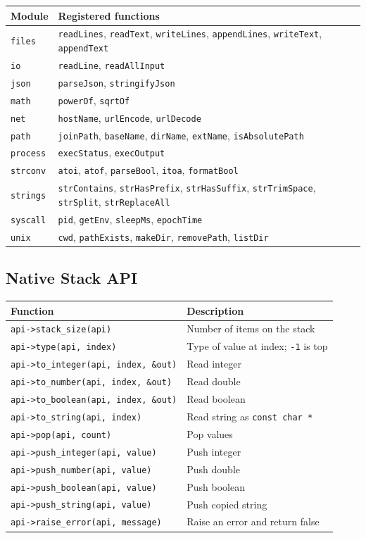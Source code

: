 \documentclass[11pt,a4paper]{article}
\newcommand{\code}[1]{\texttt{#1}}
\begin{document}
\begin{longtable}{ll}
\toprule
Module & Registered functions \\
\midrule
\code{files} & \code{readLines}, \code{readText}, \code{writeLines}, \code{appendLines}, \code{writeText}, \code{appendText} \\
\code{io} & \code{readLine}, \code{readAllInput} \\
\code{json} & \code{parseJson}, \code{stringifyJson} \\
\code{math} & \code{powerOf}, \code{sqrtOf} \\
\code{net} & \code{hostName}, \code{urlEncode}, \code{urlDecode} \\
\code{path} & \code{joinPath}, \code{baseName}, \code{dirName}, \code{extName}, \code{isAbsolutePath} \\
\code{process} & \code{execStatus}, \code{execOutput} \\
\code{strconv} & \code{atoi}, \code{atof}, \code{parseBool}, \code{itoa}, \code{formatBool} \\
\code{strings} & \code{strContains}, \code{strHasPrefix}, \code{strHasSuffix}, \code{strTrimSpace}, \code{strSplit}, \code{strReplaceAll} \\
\code{syscall} & \code{pid}, \code{getEnv}, \code{sleepMs}, \code{epochTime} \\
\code{unix} & \code{cwd}, \code{pathExists}, \code{makeDir}, \code{removePath}, \code{listDir} \\
\bottomrule
\end{longtable}

\subsection{Native Stack API}

\begin{longtable}{ll}
\toprule
Function & Description \\
\midrule
\code{api->stack\_size(api)} & Number of items on the stack \\
\code{api->type(api, index)} & Type of value at index; \code{-1} is top \\
\code{api->to\_integer(api, index, \&out)} & Read integer \\
\code{api->to\_number(api, index, \&out)} & Read double \\
\code{api->to\_boolean(api, index, \&out)} & Read boolean \\
\code{api->to\_string(api, index)} & Read string as \code{const char *} \\
\code{api->pop(api, count)} & Pop values \\
\code{api->push\_integer(api, value)} & Push integer \\
\code{api->push\_number(api, value)} & Push double \\
\code{api->push\_boolean(api, value)} & Push boolean \\
\code{api->push\_string(api, value)} & Push copied string \\
\code{api->raise\_error(api, message)} & Raise an error and return false \\
\bottomrule
\end{longtable}
\end{document}
